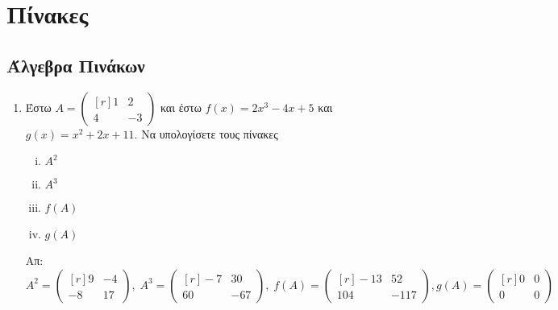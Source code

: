 \documentclass[a4paper,table]{report}
\begin{document}
\chapter*{Πίνακες}

\section*{Άλγεβρα Πινάκων}

\begin{enumerate}

\item Έστω $ A = 
  \begin{pmatrix*}[r]
    1 & 2 \\
    4 & -3
  \end{pmatrix*} $ και έστω $ f(x) = 2x^{3}-4x+5 $ και $ g(x) = x^{2}+2x+11 $. Να 
  υπολογίσετε τους πίνακες 
  \begin{enumerate}[i)]
    \item $ A^{2} $
    \item $ A^{3} $
    \item $ f(A) $
    \item $ g(A) $
  \end{enumerate}

  \hfill Απ: $ A^{2} = 
  \begin{pmatrix*}[r]
    9 & -4 \\
    -8 & 17
  \end{pmatrix*}, \; A^{3} = 
  \begin{pmatrix*}[r]
    -7 & 30 \\
    60 & -67
  \end{pmatrix*}, \; f(A) = 
  \begin{pmatrix*}[r]
    -13 & 52 \\
    104 & -117
  \end{pmatrix*}, g(A) = 
  \begin{pmatrix*}[r]
    0 & 0 \\
    0 & 0 
  \end{pmatrix*} $ 


\end{enumerate}
\end{document}
